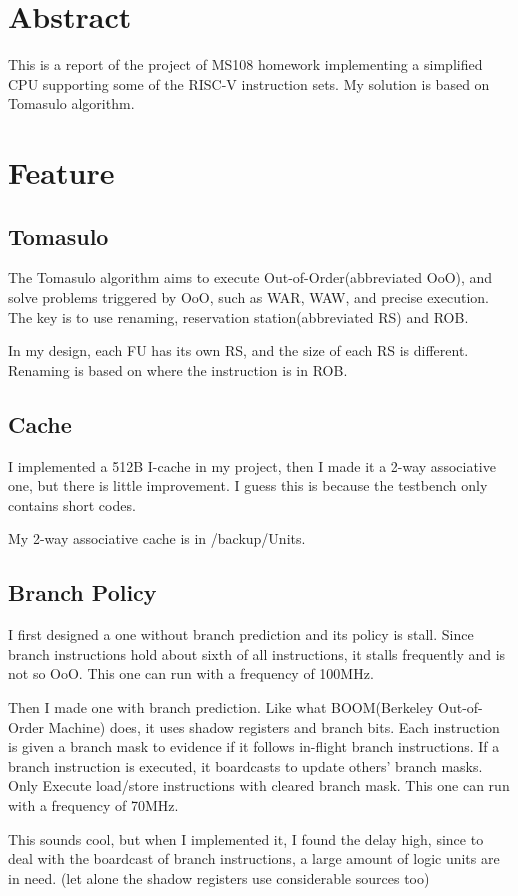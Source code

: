 \documentclass[12pt,letterpaper]{article}
\begin{document}
\section{Abstract}
    This is a report of the project of MS108 homework implementing a simplified CPU supporting some of the RISC-V instruction sets. 
    My solution is based on Tomasulo algorithm. 
\section{Feature}
\subsection{Tomasulo}
    The Tomasulo algorithm aims to execute Out-of-Order(abbreviated OoO), 
    and solve problems triggered by OoO, such as WAR, WAW, and precise execution. The key is to use renaming, 
    reservation station(abbreviated RS) and ROB. 

    In my design, each FU has its own RS, and the size of each RS is different. 
    Renaming is based on where the instruction is in ROB. 
\subsection{Cache}
    I implemented a 512B I-cache in my project, then I made it a 2-way associative one, but there is little improvement. 
    I guess this is because the testbench only contains short codes. 

    My 2-way associative cache is in /backup/Units. 
\subsection{Branch Policy}
    I first designed a one without branch prediction and its policy is stall. Since branch instructions hold about sixth of all instructions, 
    it stalls frequently and is not so OoO. This one can run with a frequency of 100MHz. 

    Then I made one with branch prediction. Like what BOOM(Berkeley Out-of-Order Machine) does, it uses shadow registers and branch bits. 
    Each instruction is given a branch mask to evidence if it follows in-flight branch instructions. If a branch instruction is executed, 
    it boardcasts to update others' branch masks. Only Execute load/store instructions with cleared branch mask. 
    This one can run with a frequency of 70MHz. 

    This sounds cool, but when I implemented it, I found the delay high, since to deal with the boardcast of branch instructions, 
    a large amount of logic units are in need. (let alone the shadow registers use considerable sources too)
\end{document}
